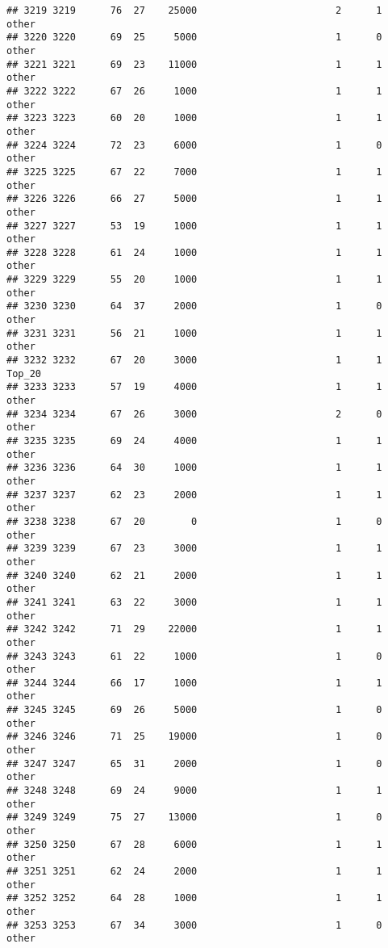 \documentclass[
]{article}
\begin{document}
\begin{verbatim}
## 3219 3219      76  27    25000                        2      1    other
## 3220 3220      69  25     5000                        1      0    other
## 3221 3221      69  23    11000                        1      1    other
## 3222 3222      67  26     1000                        1      1    other
## 3223 3223      60  20     1000                        1      1    other
## 3224 3224      72  23     6000                        1      0    other
## 3225 3225      67  22     7000                        1      1    other
## 3226 3226      66  27     5000                        1      1    other
## 3227 3227      53  19     1000                        1      1    other
## 3228 3228      61  24     1000                        1      1    other
## 3229 3229      55  20     1000                        1      1    other
## 3230 3230      64  37     2000                        1      0    other
## 3231 3231      56  21     1000                        1      1    other
## 3232 3232      67  20     3000                        1      1   Top_20
## 3233 3233      57  19     4000                        1      1    other
## 3234 3234      67  26     3000                        2      0    other
## 3235 3235      69  24     4000                        1      1    other
## 3236 3236      64  30     1000                        1      1    other
## 3237 3237      62  23     2000                        1      1    other
## 3238 3238      67  20        0                        1      0    other
## 3239 3239      67  23     3000                        1      1    other
## 3240 3240      62  21     2000                        1      1    other
## 3241 3241      63  22     3000                        1      1    other
## 3242 3242      71  29    22000                        1      1    other
## 3243 3243      61  22     1000                        1      0    other
## 3244 3244      66  17     1000                        1      1    other
## 3245 3245      69  26     5000                        1      0    other
## 3246 3246      71  25    19000                        1      0    other
## 3247 3247      65  31     2000                        1      0    other
## 3248 3248      69  24     9000                        1      1    other
## 3249 3249      75  27    13000                        1      0    other
## 3250 3250      67  28     6000                        1      1    other
## 3251 3251      62  24     2000                        1      1    other
## 3252 3252      64  28     1000                        1      1    other
## 3253 3253      67  34     3000                        1      0    other

\end{verbatim}
\end{document}
